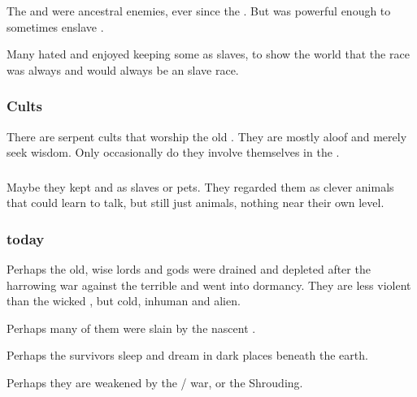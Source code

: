\subsubsection{\Aryothim}
The \ophidians and \aryothim were ancestral enemies, ever since the .
But  was powerful enough to sometimes enslave \aryothim. 

Many \ophidians hated \aryothim and enjoyed keeping some \aryothim as slaves, to show the world that the \aryoth race was always and would always be an \ophidian slave race. 





\subsubsection{Cults}
There are serpent cults that worship the old \ophidians. 
They are mostly aloof and merely seek wisdom. 
Only occasionally do they involve themselves in the \feud. 





\subsubsection{\Nephilim}
Maybe they kept \nephilim{} and \meccara{} as slaves or pets. 
They regarded them as clever animals that could learn to talk, but still just animals, nothing near their own level. 





\subsubsection{\Ophidians today}
Perhaps the old, wise \ophidian{} lords and gods were drained and depleted after the harrowing war against the terrible \xzaishanns{} and went into dormancy. 
They are less violent than the wicked \draecchonosh, but cold, inhuman and alien. 

Perhaps many of them were slain by the nascent \draecchonosh. 

Perhaps the survivors sleep and dream in dark places beneath the earth. 

Perhaps they are weakened by the \dragon/\bane{} war, or the Shrouding. 

